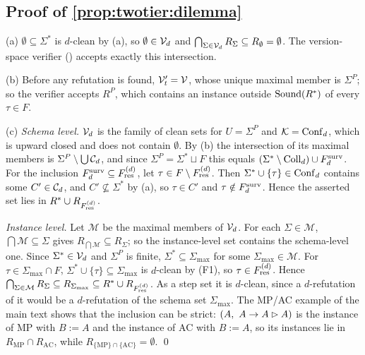 \subsection{Proof of \texorpdfstring{\cref{prop:twotier:dilemma}}{the dilemma}}\label{app:twotier:dilemma}

(a) $\emptyset\subseteq\Sigma^*$ is $d$-clean by (a), so $\emptyset\in\mathcal{V}_d$ and $\bigcap_{\Sigma\in\mathcal{V}_d}R_\Sigma\subseteq R_\emptyset=\emptyset$. The version-space verifier () accepts exactly this intersection.

(b) Before any refutation is found, $\mathcal{V}'_t=\mathcal{V}$, whose unique maximal member is $\Sigma^P$; so the verifier accepts $R^P$, which contains an instance outside $\mathrm{Sound}(R^{*})$ of every $\tau\in F$.

(c) \emph{Schema level.} $\mathcal{V}_d$ is the family of clean sets for $U=\Sigma^P$ and $\mathcal K=\mathrm{Conf}_d$, which is upward closed and does not contain $\emptyset$. By (b) the intersection of its maximal members is $\Sigma^P\setminus\bigcup\mathcal{C}_d$, and since $\Sigma^P=\Sigma^*\sqcup F$ this equals $(\Sigma^*\setminus\mathrm{Coll}_d)\cup F^{\mathrm{surv}}_{d}$. For the inclusion $F^{\mathrm{surv}}_{d}\subseteq F^{(d)}_{\mathrm{res}}$, let $\tau\in F\setminus F^{(d)}_{\mathrm{res}}$. Then $\Sigma^*\cup\{\tau\}\in\mathrm{Conf}_d$ contains some $C'\in\mathcal{C}_d$, and $C'\not\subseteq\Sigma^*$ by (a), so $\tau\in C'$ and $\tau\notin F^{\mathrm{surv}}_{d}$. Hence the asserted set lies in $R^{*}\cup R_{F^{(d)}_{\mathrm{res}}}$.

\emph{Instance level.} Let $\mathcal M$ be the maximal members of $\mathcal{V}_d$. For each $\Sigma\in\mathcal M$, $\bigcap\mathcal M\subseteq\Sigma$ gives $R_{\bigcap\mathcal M}\subseteq R_\Sigma$; so the instance-level set contains the schema-level one. Since $\Sigma^*\in\mathcal{V}_d$ and $\Sigma^P$ is finite, $\Sigma^*\subseteq\Sigma_{\max}$ for some $\Sigma_{\max}\in\mathcal M$. For $\tau\in\Sigma_{\max}\cap F$, $\Sigma^*\cup\{\tau\}\subseteq\Sigma_{\max}$ is $d$-clean by (F1), so $\tau\in F^{(d)}_{\mathrm{res}}$. Hence $\bigcap_{\Sigma\in\mathcal M}R_\Sigma\subseteq R_{\Sigma_{\max}}\subseteq R^{*}\cup R_{F^{(d)}_{\mathrm{res}}}$. As a step set it is $d$-clean, since a $d$-refutation of it would be a $d$-refutation of the schema set $\Sigma_{\max}$. The MP/AC example of the main text shows that the inclusion can be strict: $(A,\ A\to A\rhd A)$ is the instance of MP with $B:=A$ and the instance of AC with $B:=A$, so its instances lie in $R_{\mathrm{MP}}\cap R_{\mathrm{AC}}$, while $R_{\{\mathrm{MP}\}\cap\{\mathrm{AC}\}}=\emptyset$. \qed

